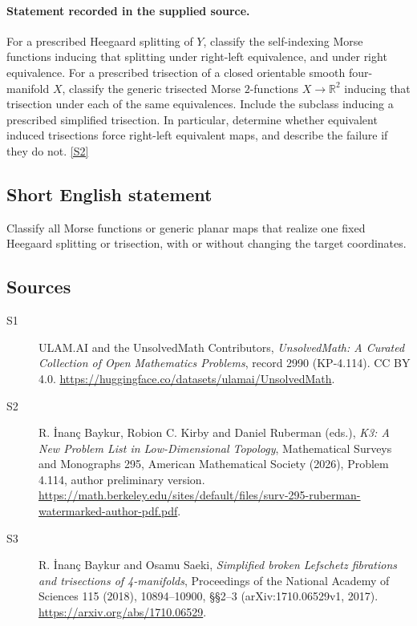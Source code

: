 \documentclass[11pt]{article}
\newcommand{\sref}[2]{\hyperlink{source:#1:#2}{[S#2]}}
\begin{document}
\paragraph{Statement recorded in the supplied source.}
For a prescribed Heegaard splitting of $Y$, classify the self-indexing Morse functions inducing that splitting under right-left equivalence, and under right equivalence. For a prescribed trisection of a closed orientable smooth four-manifold $X$, classify the generic trisected Morse $2$-functions $X\to\mathbb R^2$ inducing that trisection under each of the same equivalences. Include the subclass inducing a prescribed simplified trisection. In particular, determine whether equivalent induced trisections force right-left equivalent maps, and describe the failure if they do not. \sref{2990}{2}
\subsection{Short English statement}
Classify all Morse functions or generic planar maps that realize one fixed Heegaard splitting or trisection, with or without changing the target coordinates.
\subsection{Sources}
\begin{description}
\item[\hypertarget{source:2990:1}{S1}] ULAM.AI and the UnsolvedMath Contributors, \emph{UnsolvedMath: A Curated Collection of Open Mathematics Problems}, record 2990 (KP-4.114). CC BY 4.0. \url{https://huggingface.co/datasets/ulamai/UnsolvedMath}.
\item[\hypertarget{source:2990:2}{S2}] R. İnanç Baykur, Robion C. Kirby and Daniel Ruberman (eds.), \emph{K3: A New Problem List in Low-Dimensional Topology}, Mathematical Surveys and Monographs 295, American Mathematical Society (2026), Problem 4.114, author preliminary version. \url{https://math.berkeley.edu/sites/default/files/surv-295-ruberman-watermarked-author-pdf.pdf}.
\item[\hypertarget{source:2990:3}{S3}] R. İnanç Baykur and Osamu Saeki, \emph{Simplified broken Lefschetz fibrations and trisections of 4-manifolds}, Proceedings of the National Academy of Sciences 115 (2018), 10894--10900, §§2--3 (arXiv:1710.06529v1, 2017). \url{https://arxiv.org/abs/1710.06529}.
\end{description}
\label{end:2990}
\end{document}
